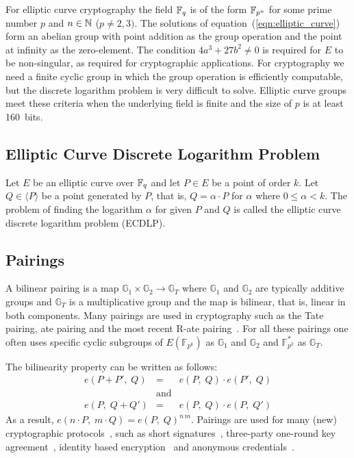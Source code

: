 For elliptic curve cryptography the field $\mathbb{F}_{q}$ is of the form $\mathbb{F}_{p^n}$ for
some prime number $p$ and $n \in \mathbb{N}$ ($p \neq 2,3)$. The solutions of
equation~(\ref{eqn:elliptic_curve}) form an abelian group with point addition
as the group operation and the point at infinity as the zero-element. The
condition $4a^3 + 27b^2 \neq 0$ is required for $E$ to be non-singular, as
required for cryptographic applications. For cryptography we need a finite
cyclic group in which the group operation is efficiently computable, but the
discrete logarithm problem is very difficult to solve. Elliptic curve groups
meet these criteria when the underlying field is finite and the size of $p$ is
at least 160~bits.

\subsection{Elliptic Curve Discrete Logarithm Problem}

Let $E$ be an elliptic curve over $\mathbb{F}_{q}$ and let $P \in E$ be a point of order
$k$. Let $Q \in \langle P \rangle$ be a point generated by $P$, that is,
$Q = \alpha \cdot P$ for $\alpha$ where $0 \leq \alpha < k$. The problem of
finding the logarithm $\alpha$ for given $P$ and $Q$ is called the elliptic
curve discrete logarithm problem (ECDLP).


\subsection{Pairings\label{sec:pairings}}

A bilinear pairing is a map $\mathbb{G}_1 \times \mathbb{G}_2 \rightarrow
\mathbb{G}_T$ where $\mathbb{G}_1$ and $\mathbb{G}_2$ are typically additive
groups and $\mathbb G_T$ is a multiplicative group and the map is bilinear, that
is, linear in both components. Many pairings are used in cryptography such as the
Tate pairing, ate pairing and the most recent R-ate
pairing~\cite{Vercauteren09}. For all these pairings one often uses specific cyclic
subgroups of $E(\mathbb{F}_{p^k})$ as $\mathbb{G}_1$ and $\mathbb{G}_2$
and $\mathbb{F}_{p^k}^*$ as $\mathbb{G}_T$.

The bilinearity property can be written as follows:
\begin{equation*}
  \begin{array}{rcl}
    e(P + P',\; Q) & = & e(P,\; Q)\cdot e(P',\; Q) \\
     & \text{and} & \\
    e(P,\; Q + Q') & = & e(P,\; Q)\cdot e(P,\; Q')
  \end{array}
\end{equation*}
As a result, $e(n\cdot P,\; m\cdot Q) = e(P,\; Q)^{n\,m}$. Pairings are used for many
(new) cryptographic protocols~\cite{BSS05}, such as short
signatures~\cite{BonehLS04}, three-party one-round key agreement~\cite{Joux04},
identity based encryption~\cite{BonehFranklin01} and anonymous
credentials~\cite{CamenischLysyanskaya04}.

